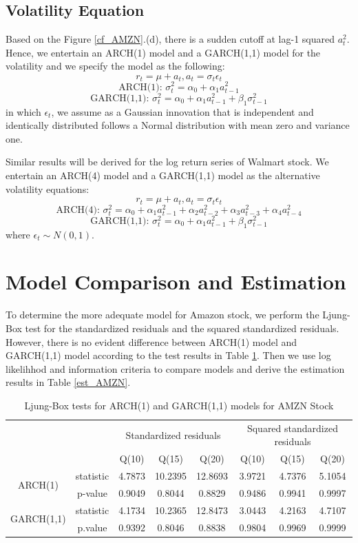 \documentclass[paper=a4, fontsize=11pt]{article}
\begin{document}
\subsection{Volatility Equation}
Based on the Figure \ref{cf_AMZN}.(d), there is a sudden cutoff at lag-1 squared $a_t^2$. Hence, we entertain an ARCH(1) model and a GARCH(1,1) model for the volatility and we specify the model as the following:
\[ r_t = \mu+a_t, a_t = \sigma_t \epsilon_t \]
\[ \text{ARCH(1): } \sigma_t^2 = \alpha_0+\alpha_1 a_{t-1}^2 \]
\[ \text{GARCH(1,1): } \sigma_t^2= \alpha_0+\alpha_1 a_{t-1}^2+\beta_1 \sigma_{t-1}^2 \]
in which $\epsilon_t$, we assume as a Gaussian innovation that is independent and identically distributed follows a Normal distribution with mean zero and variance one.

Similar results will be derived for the log return series of Walmart stock. We entertain an ARCH(4) model and a GARCH(1,1) model as the alternative volatility equations:
\[ r_t = \mu+a_t, a_t = \sigma_t \epsilon_t \]
\[ \text{ARCH(4): } \sigma_t^2 = \alpha_0+\alpha_1 a_{t-1}^2+\alpha_2 a_{t-2}^2+\alpha_3 a_{t-3}^2+\alpha_4 a_{t-4}^2 \]
\[ \text{GARCH(1,1): } \sigma_t^2= \alpha_0+\alpha_1 a_{t-1}^2+\beta_1 \sigma_{t-1}^2 \]
where $\epsilon_t \sim N(0,1)$.


\section{Model Comparison and Estimation}
To determine the more adequate model for Amazon stock, we perform the Ljung-Box test for the standardized residuals and the squared standardized residuals. However, there is no evident difference between ARCH(1) model and GARCH(1,1) model according to the test results in Table \ref{lb_AMZN}. Then we use log likelihhod and information criteria to compare models and derive the estimation results in Table \ref{est_AMZN}.

\begin{table}[!htbp] \centering 
  \caption{Ljung-Box tests for ARCH(1) and GARCH(1,1) models for AMZN Stock} 
  \label{lb_AMZN} 
\begin{tabular}{cc|cccccc} 
\\[-1.8ex]\hline 
\hline
& & \multicolumn{3}{c}{Standardized residuals} & \multicolumn{3}{c}{Squared standardized residuals} \\
& & Q(10) & Q(15) & Q(20) & Q(10) & Q(15) & Q(20) \\
\hline 
\multirow{2}{*}{ARCH(1)} & statistic & 4.7873 & 10.2395 & 12.8693 & 3.9721 & 4.7376 & 5.1054 \\
& p-value & 0.9049 & 0.8044 & 0.8829 & 0.9486 & 0.9941 & 0.9997 \\
\multirow{2}{*}{GARCH(1,1)} & statistic & 4.1734 & 10.2365 & 12.8473 & 3.0443 & 4.2163 & 4.7107 \\
& p.value & 0.9392 & 0.8046 & 0.8838 & 0.9804 & 0.9969 & 0.9999 \\
\hline
\hline 
\end{tabular} 
\end{table} 
\end{document}
